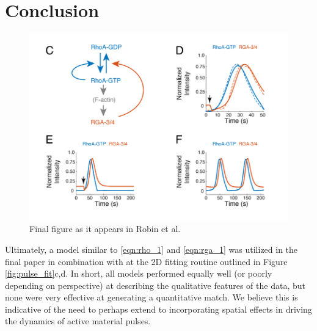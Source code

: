 \section{Conclusion}
\begin{figure}[h!]
\centering
\includegraphics[width=\hsize]{pulse/final_fig.png}
\caption{\label{fig:pulse_final}  Final figure as it appears in Robin et al.}
\end{figure}
Ultimately, a model similar to \ref{eqn:rho_1} and \ref{eqn:rga_1} was utilized in the final paper in combination with at the 2D fitting routine outlined in Figure \ref{fig:pulse_fit}c,d.   In short, all models performed equally well (or poorly depending on perspective) at describing the qualitative features of the data, but none were very effective at generating a quantitative match.    We believe this is indicative of the need to perhaps extend to incorporating spatial effects in driving the dynamics of active material pulses.